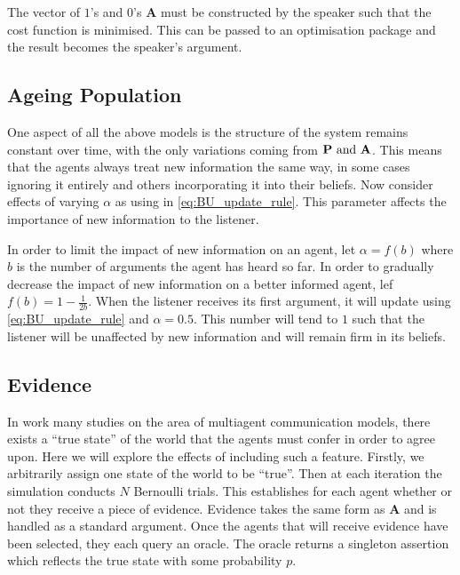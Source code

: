 The vector of $1$'s and $0$'s $\mathbf{A}$ must be constructed by the speaker such that the cost function is minimised. This can be passed to an optimisation package and the result becomes the speaker's argument. 




\subsection{Ageing Population}

One aspect of all the above models is the structure of the system remains constant over time, with the only variations coming from $\mathbf{P} \textnormal{ and } \mathbf{A}$. This means that the agents always treat new information the same way, in some cases ignoring it entirely and others incorporating it into their beliefs. Now consider effects of varying $\alpha$ as using in \cref{eq:BU_update_rule}. This parameter affects the importance of new information to the listener. 

In order to limit the impact of new information on an agent, let $\alpha = f(b)$ where $b$ is the number of arguments the agent has heard so far. In order to gradually decrease the impact of new information on a better informed agent, lef $f(b) = 1 - \frac{1}{2b}$. When the listener receives its first argument, it will update using \cref{eq:BU_update_rule} and $\alpha = 0.5$. This number will tend to $1$ such that the listener will be unaffected by new information and will remain firm in its beliefs. 


\subsection{Evidence}

In work many studies on the area of multiagent communication models, there exists a ``true state'' of the world that the agents must confer in order to agree upon. Here we will explore the effects of including such a feature. Firstly, we arbitrarily assign one state of the world to be ``true''. Then at each iteration the simulation conducts $N$ Bernoulli trials. This establishes for each agent whether or not they receive a piece of evidence. Evidence takes the same form as $\mathbf{A}$ and is handled as a standard argument. Once the agents that will receive evidence have been selected, they each query an oracle. The oracle returns a singleton assertion which reflects the true state with some probability $p$. 


